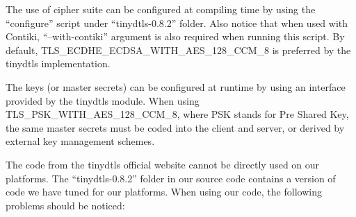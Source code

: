 The use of cipher suite can be configured at compiling time by using the ``configure'' script under ``tinydtls-0.8.2'' folder. Also notice that when used with Contiki, ``--with-contiki'' argument is also required when running this script. By default, TLS\_ECDHE\_ECDSA\_WITH\_AES\_128\_CCM\_8 is preferred by the tinydtls implementation.

The keys (or master secrets) can be configured at runtime by using an interface provided by the tinydtls module. When using TLS\_PSK\_WITH\_AES\_128\_CCM\_8, where PSK stands for Pre Shared Key, the same master secrets must be coded into the client and server, or derived by external key management schemes.

The code from the tinydtls official website cannot be directly used on our platforms. The ``tinydtls-0.8.2'' folder in our source code contains a version of code we have tuned for our platforms. When using our code, the following problems should be noticed:


